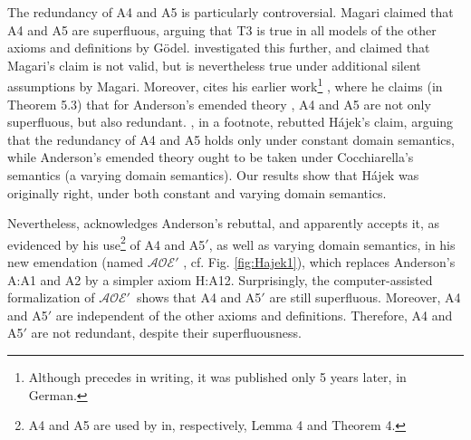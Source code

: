 \documentclass{birkjour}
\newcommand{\AOEH}{$\mathcal{AOE}'$}
\theoremstyle{definition}
\theoremstyle{remark}
\numberwithin{equation}{section}
\begin{document}
The redundancy of A4 and A5 is particularly controversial. Magari
\cite{Magari1988} claimed that A4 and A5 are superfluous, arguing that T3 is true in all
models of the other axioms and definitions by Gödel.
\citet[pp.~5--6]{Hajek_Magari_and_others_1996} investigated this
further, and claimed that Magari's claim is not valid, but is
nevertheless true  under additional silent assumptions by Magari.
Moreover, \citet[p.~2]{Hajek_Magari_and_others_1996} cites his earlier
work\footnote{Although \citep{Hajek_der_Mathematiker_2001} precedes
\citep{Hajek_Magari_and_others_1996} in writing, it was published only
5 years later, in German.} \citep{Hajek_der_Mathematiker_2001}, where
he claims (in Theorem 5.3) that for Anderson's emended theory
\citep{anderson90:_some_emend_of_goedel_ontol_proof}, A4 and A5 are
not only superfluous, but also redundant. \citet[footnote 1 in
p.~1]{AndersonGettings}, in a footnote, rebutted Hájek's claim,
arguing that the redundancy of A4 and A5 holds only under constant
domain semantics, while Anderson's emended theory ought to be taken
under Cocchiarella's semantics \citep{Cocchiarella} (a varying domain
semantics). Our results show that Hájek was originally right, under
both constant and varying domain semantics.

Nevertheless, \citet[p.~7]{Hajek2002} acknowledges Anderson's rebuttal,
and apparently accepts it, as evidenced by his use\footnote{
  A4 and A5 are used by \citet[p.~11]{Hajek2002} in,
  respectively, Lemma 4 and Theorem 4.
}
of A4 and A5$'$, as well as varying domain semantics, in his new
emendation (named \AOEH\/ \citep[sec.~4]{Hajek2002}, cf. Fig.
\ref{fig:Hajek1}), which replaces Anderson's A:A1 and A2 by a simpler
axiom H:A12. Surprisingly, the computer-assisted formalization of
\AOEH\ shows that A4 and A5$'$ are still superfluous. Moreover,
A4 and A5$'$ are independent
of the other axioms and definitions.
Therefore, A4 and A5$'$ are not redundant, despite their superfluousness.
\end{document}
